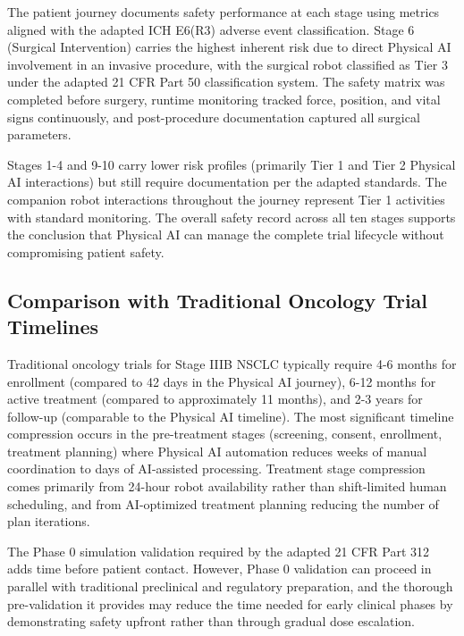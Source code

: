 The patient journey documents safety performance at each stage using metrics
aligned with the adapted ICH E6(R3) \cite{ich-adapt} adverse event
classification. Stage 6 (Surgical Intervention) carries the highest inherent
risk due to direct Physical AI involvement in an invasive procedure, with the
surgical robot classified as Tier 3 under the adapted 21 CFR Part 50
\cite{cfr50-adapt} classification system. The safety matrix was completed
before surgery, runtime monitoring tracked force, position, and vital signs
continuously, and post-procedure documentation captured all surgical
parameters.

Stages 1-4 and 9-10 carry lower risk profiles (primarily Tier 1 and Tier 2
Physical AI interactions) but still require documentation per the adapted
standards. The companion robot interactions throughout the journey represent
Tier 1 activities with standard monitoring. The overall safety record across
all ten stages supports the conclusion that Physical AI can manage the
complete trial lifecycle without compromising patient safety.

\subsection{Comparison with Traditional Oncology Trial Timelines}
\label{subsec:journey-traditional-comparison}

Traditional oncology trials for Stage IIIB NSCLC typically require 4-6 months
for enrollment (compared to 42 days in the Physical AI journey), 6-12 months
for active treatment (compared to approximately 11 months), and 2-3 years for
follow-up (comparable to the Physical AI timeline). The most significant
timeline compression occurs in the pre-treatment stages (screening, consent,
enrollment, treatment planning) where Physical AI automation reduces weeks of
manual coordination to days of AI-assisted processing. Treatment stage
compression comes primarily from 24-hour robot availability rather than
shift-limited human scheduling, and from AI-optimized treatment planning
reducing the number of plan iterations.

The Phase 0 simulation validation required by the adapted 21 CFR Part 312
\cite{cfr312-adapt} adds time before patient contact. However, Phase 0
validation can proceed in parallel with traditional preclinical and regulatory
preparation, and the thorough pre-validation it provides may reduce the time
needed for early clinical phases by demonstrating safety upfront rather than
through gradual dose escalation.

